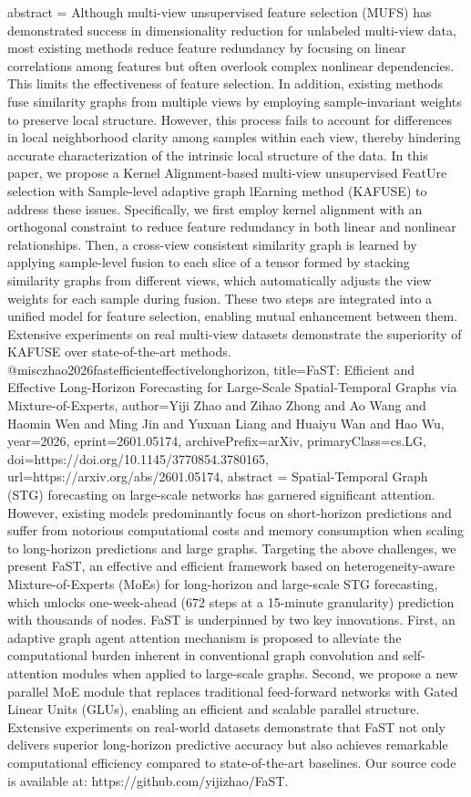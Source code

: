 {      abstract = {Although multi-view unsupervised feature selection (MUFS) has demonstrated success in dimensionality reduction for unlabeled multi-view data, most existing methods reduce feature redundancy by focusing on linear correlations among features but often overlook complex nonlinear dependencies. This limits the effectiveness of feature selection. In addition, existing methods fuse similarity graphs from multiple views by employing sample-invariant weights to preserve local structure. However, this process fails to account for differences in local neighborhood clarity among samples within each view, thereby hindering accurate characterization of the intrinsic local structure of the data. In this paper, we propose a Kernel Alignment-based multi-view unsupervised FeatUre selection with Sample-level adaptive graph lEarning method (KAFUSE) to address these issues. Specifically, we first employ kernel alignment with an orthogonal constraint to reduce feature redundancy in both linear and nonlinear relationships. Then, a cross-view consistent similarity graph is learned by applying sample-level fusion to each slice of a tensor formed by stacking similarity graphs from different views, which automatically adjusts the view weights for each sample during fusion. These two steps are integrated into a unified model for feature selection, enabling mutual enhancement between them. Extensive experiments on real multi-view datasets demonstrate the superiority of KAFUSE over state-of-the-art methods.}
}@misc{zhao2026fastefficienteffectivelonghorizon,
      title={FaST: Efficient and Effective Long-Horizon Forecasting for Large-Scale Spatial-Temporal Graphs via Mixture-of-Experts}, 
      author={Yiji Zhao and Zihao Zhong and Ao Wang and Haomin Wen and Ming Jin and Yuxuan Liang and Huaiyu Wan and Hao Wu},
      year={2026},
      eprint={2601.05174},
      archivePrefix={arXiv},
      primaryClass={cs.LG},
      doi={https://doi.org/10.1145/3770854.3780165},
      url={https://arxiv.org/abs/2601.05174},
      abstract = {Spatial-Temporal Graph (STG) forecasting on large-scale networks has garnered significant attention. However, existing models predominantly focus on short-horizon predictions and suffer from notorious computational costs and memory consumption when scaling to long-horizon predictions and large graphs. Targeting the above challenges, we present FaST, an effective and efficient framework based on heterogeneity-aware Mixture-of-Experts (MoEs) for long-horizon and large-scale STG forecasting, which unlocks one-week-ahead (672 steps at a 15-minute granularity) prediction with thousands of nodes. FaST is underpinned by two key innovations. First, an adaptive graph agent attention mechanism is proposed to alleviate the computational burden inherent in conventional graph convolution and self-attention modules when applied to large-scale graphs. Second, we propose a new parallel MoE module that replaces traditional feed-forward networks with Gated Linear Units (GLUs), enabling an efficient and scalable parallel structure. Extensive experiments on real-world datasets demonstrate that FaST not only delivers superior long-horizon predictive accuracy but also achieves remarkable computational efficiency compared to state-of-the-art baselines. Our source code is available at: https://github.com/yijizhao/FaST.}
}
